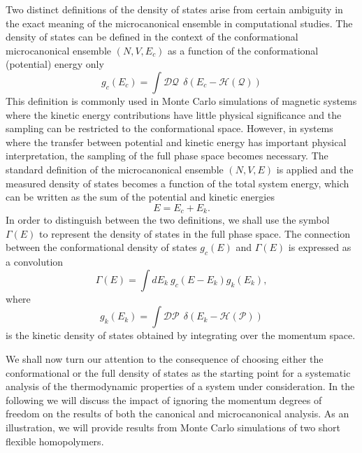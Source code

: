 \documentclass[12pt]{report}
\begin{document}
Two distinct definitions of the density of states arise from certain ambiguity in the exact meaning of the microcanonical ensemble in computational studies. The density of states can be defined in the context of the conformational microcanonical ensemble $(N,V,E_{c})$ as a function of the conformational (potential) energy only
\begin{equation}
g_{c}(E_{c}) = \int \mathcal{DQ} \:\: \delta(E_{c} - \mathcal{H}(\mathcal{Q}))
\end{equation}
This definition is commonly used in Monte Carlo simulations of magnetic systems where the kinetic energy contributions have little physical significance and the sampling can be restricted to the conformational space. However, in systems where the transfer between potential and kinetic energy has important physical interpretation, the sampling of the full phase space becomes necessary. The standard definition of the microcanonical ensemble $(N,V,E)$ is applied and the measured density of states becomes a function of the total system energy, which can be written as the sum of the potential and kinetic energies
\begin{equation}
E = E_{c} + E_{k}.
\end{equation}
In order to distinguish between the two definitions, we shall use the symbol $\Gamma(E)$ to represent the density of states in the full phase space. The connection between the conformational density of states $g_{c}(E)$ and $\Gamma(E)$ is expressed as a convolution\cite{Calvo1995}
\begin{equation}
\label{eq:TotalDOS}
\Gamma(E) = \int dE_{k} \: g_{c}(E - E_{k})g_{k}(E_{k}),
\end{equation}
where 
\begin{equation}
g_{k}(E_{k}) = \int \mathcal{DP} \:\: \delta(E_{k} - \mathcal{H}(\mathcal{P}))
\end{equation}
is the kinetic density of states obtained by integrating over the momentum space.

We shall now turn our attention to the consequence of choosing either the conformational or the full density of states as the starting point for a systematic analysis of the thermodynamic properties of a system under consideration. In the following we will discuss the impact of ignoring the momentum degrees of freedom on the results of both the canonical and microcanonical analysis. As an illustration, we will provide results from Monte Carlo simulations of two short flexible homopolymers.
\end{document}
